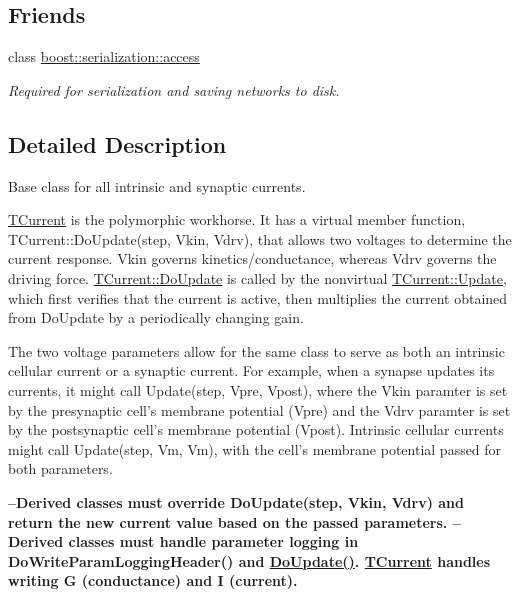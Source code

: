 \subsection*{Friends}
\begin{DoxyCompactItemize}
\item 
\hypertarget{class_t_current_ac98d07dd8f7b70e16ccb9a01abf56b9c}{class \hyperlink{class_t_current_ac98d07dd8f7b70e16ccb9a01abf56b9c}{boost\+::serialization\+::access}}\label{class_t_current_ac98d07dd8f7b70e16ccb9a01abf56b9c}

\begin{DoxyCompactList}\small\item\em Required for serialization and saving networks to disk. \end{DoxyCompactList}\end{DoxyCompactItemize}


\subsection{Detailed Description}
Base class for all intrinsic and synaptic currents. 

\hyperlink{class_t_current}{T\+Current} is the polymorphic workhorse. It has a virtual member function, T\+Current\+::\+Do\+Update(step, Vkin, Vdrv), that allows two voltages to determine the current response. Vkin governs kinetics/conductance, whereas Vdrv governs the driving force. \hyperlink{class_t_current_a36d89025eb424f6905fef945c9ae4fa7}{T\+Current\+::\+Do\+Update} is called by the nonvirtual \hyperlink{class_t_current_a31d02f0a83f4f46906a20b4c18866d99}{T\+Current\+::\+Update}, which first verifies that the current is active, then multiplies the current obtained from Do\+Update by a periodically changing gain.

The two voltage parameters allow for the same class to serve as both an intrinsic cellular current or a synaptic current. For example, when a synapse updates its currents, it might call Update(step, Vpre, Vpost), where the Vkin paramter is set by the presynaptic cell's membrane potential (Vpre) and the Vdrv paramter is set by the postsynaptic cell's membrane potential (Vpost). Intrinsic cellular currents might call Update(step, Vm,   Vm), with the cell's membrane potential passed for both parameters.

{\bfseries  --Derived classes must override Do\+Update(step, Vkin, Vdrv) and return the new current value based on the passed parameters. --Derived classes must handle parameter logging in Do\+Write\+Param\+Logging\+Header() and \hyperlink{class_t_current_a36d89025eb424f6905fef945c9ae4fa7}{Do\+Update()}. \hyperlink{class_t_current}{T\+Current} handles writing G (conductance) and I (current). }

